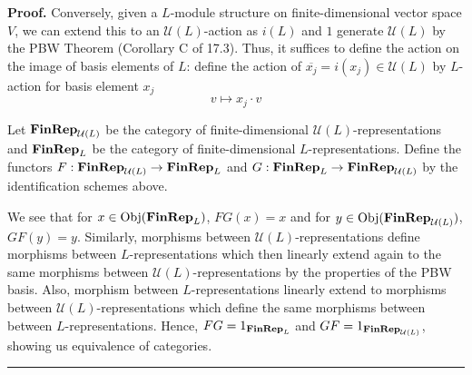 \documentclass[12pt]{article}%
\newenvironment{proof}[1][Proof]{\textbf{#1.} }{\ \rule{0.5em}{0.5em}}
\begin{document}
\begin{proof}
 Conversely, given a $L$-module structure on finite-dimensional vector space $V$, we can extend this to an $\mathcal{U}(L)$-action as $i(L)$ and $1$ generate $\mathcal{U}(L)$ by the PBW Theorem (Corollary C of 17.3). Thus, it suffices to define the action on the image of basis elements of $L$: define the action of $\overline{x_j} = i(x_j) \in \mathcal{U}(L)$ by $L$-action for basis element $x_j$
 $$ v \mapsto x_j \cdot v $$

Let ${\bf FinRep}_{\mathcal{U}(L)}$ be the category of finite-dimensional $\mathcal{U}(L)$-representations and ${\bf FinRep}_{L}$ be the category of finite-dimensional $L$-representations. Define the functors $F:{\bf FinRep}_{\mathcal{U}(L)} \rightarrow {\bf FinRep}_{L}$ and $G:{\bf FinRep}_{L} \rightarrow  {\bf FinRep}_{\mathcal{U}(L)}$ by the identification schemes above.
\newline

We see that for $x \in \text{Obj}({\bf FinRep}_{L})$, $FG(x) = x$ and for $y \in \text{Obj}({\bf FinRep}_{\mathcal{U}(L)})$, $GF(y) = y$. Similarly, morphisms between ${\mathcal{U}(L)}$-representations define morphisms between $L$-representations which then linearly extend again to the same morphisms between ${\mathcal{U}(L)}$-representations by the properties of the PBW basis. Also, morphism between $L$-representations linearly extend to morphisms between ${\mathcal{U}(L)}$-representations which define the same morphisms between between $L$-representations. Hence, $FG = 1_{{\bf FinRep}_{L}}$ and $GF = 1_{{\bf FinRep}_{\mathcal{U}(L)}}$, showing us equivalence of categories.
\end{proof}
\end{document}
